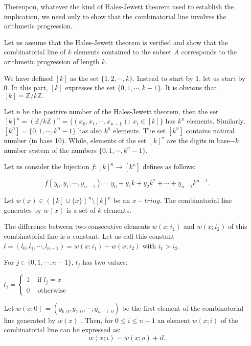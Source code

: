 Thereupon, whatever the kind of Hales-Jewett theorem used to establish the implication, we need  only to show that the combinatorial line involves the arithmetic progression.

Let us  assume that the Hales-Jewett theorem is verified and show that the combinatorial line of $k$ elements contained to the subset $A$ corresponds to the arithmetic progression of length $k$.

We have defined $[k]$ as the set $\{1,2,\cdots, k\}.$ Instead to start by $1$, let us start by $0.$ In this part, $[k]$ expresses the set $\{0,1,\cdots, k-1\}.$ It is obvious that $[k]=\mathbb{Z}/k\mathbb{Z}.$

Let $n$ be the positive number of the Hales-Jewett theorem, then the set $[k]^n=(\mathbb{Z}/k\mathbb{Z})^n=\{(x_0,x_1, \cdots, x_{n-1}): \ x_i \in [k] \}$ has $k^n$ elements. Similarly, $[k^n]=\{0,1,\cdots, k^n-1\}$ has also $k^n$ elements. The set $[k^n]$ contains natural number (in base 10). While, elements of the set $[k]^n$ are the digits  in base$-k$ number system of the numbers $\{0,1,\cdots,k^n-1\}.$

Let us consider the bijection $f:[k]^n \longrightarrow [k^n]$ defines as follows:

$$f(y_0,y_1,\cdots, y_{n-1})=y_0+y_1k+y_2 k^2+\cdots+y_{n-1}k^{n-1}.$$

Let $w(x) \in ([k] \cup \{x\})^n\setminus [k]^n$ be an $x-tring.$ The combinatorial line generates by $w(x)$ is a set of $k$ elements.

The difference between two consecutive elements $w(x;i_1)$ and $w(x;i_2)$ of this combinatorial line is a constant. Let us call this constant $l=(l_0, l_1, \cdots, l_{n-1})= w(x;i_1)-w(x;i_2)$ with $i_1 > i_2.$

For $j\in \{0,1,\cdots, n-1\}$, $l_j$ has two values:

$l_j= \left\lbrace \begin{array}{ll}1 & \text{ if } l_j=x \\ 0 & \text{ otherwise}    \end{array} \right.$

Let $w(x;0)=(y_{0,0},y_{1,0},\cdots, y_{n-1,0})$ be the first element of the combinatorial line generated by $w(x)$ . Then, for $0\leq i \leq n-1$ an element $w(x;i)$ of the combinatorial line can be expressed as: $$w(x;i)=w(x;o)+il.$$

